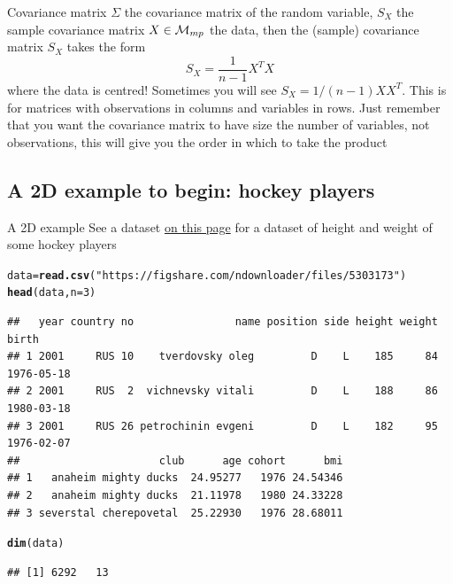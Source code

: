 \documentclass[aspectratio=169]{beamer}\usepackage[]{graphicx}\usepackage[]{xcolor}
\makeatletter
\newcommand{\hlnum}[1]{\textcolor[rgb]{0.686,0.059,0.569}{#1}}%
\newcommand{\hlsng}[1]{\textcolor[rgb]{0.192,0.494,0.8}{#1}}%
\newcommand{\hldef}[1]{\textcolor[rgb]{0.345,0.345,0.345}{#1}}%
\newcommand{\hlkwb}[1]{\textcolor[rgb]{0.69,0.353,0.396}{#1}}%
\newcommand{\hlkwc}[1]{\textcolor[rgb]{0.333,0.667,0.333}{#1}}%
\newcommand{\hlkwd}[1]{\textcolor[rgb]{0.737,0.353,0.396}{\textbf{#1}}}%
\newenvironment{kframe}{%
 \def\at@end@of@kframe{}%
 \ifinner\ifhmode%
  \def\at@end@of@kframe{\end{minipage}}%
  \begin{minipage}{\columnwidth}%
 \fi\fi%
 \def\FrameCommand##1{\hskip\@totalleftmargin \hskip-\fboxsep
 \colorbox{shadecolor}{##1}\hskip-\fboxsep
     \hskip-\linewidth \hskip-\@totalleftmargin \hskip\columnwidth}%
 \MakeFramed {\advance\hsize-\width
   \@totalleftmargin\z@ \linewidth\hsize
   \@setminipage}}%
 {\par\unskip\endMakeFramed%
 \at@end@of@kframe}
\newenvironment{knitrout}{}{} %
\makeatother
\begin{document}
\begin{frame}{Covariance matrix}
$\Sigma$ the covariance matrix of the random variable, $S_X$ the sample covariance matrix
\vfill
$X\in\mathcal{M}_{mp}$ the data, then the (sample) covariance matrix $S_X$ takes the form
\[
S_X = \frac{1}{n-1}X^TX
\]
where the data is centred!
\vfill
Sometimes you will see $S_X=1/(n-1)XX^T$. This is for matrices with observations in columns and variables in rows. Just remember that you want the covariance matrix to have size the number of variables, not observations, this will give you the order in which to take the product
\end{frame}

\subsection{A 2D example to begin: hockey players}

\begin{frame}[fragile]{A 2D example}
See a dataset \href{https://opendata.stackexchange.com/questions/7793/age-weight-and-height-dataset}{on this page} for a dataset of height and weight of some hockey players
\vfill
\begin{knitrout}
\color{fgcolor}\begin{kframe}
\begin{alltt}
\hldef{data} \hlkwb{=} \hlkwd{read.csv}\hldef{(}\hlsng{"https://figshare.com/ndownloader/files/5303173"}\hldef{)}
\hlkwd{head}\hldef{(data,} \hlkwc{n}\hldef{=}\hlnum{3}\hldef{)}
\end{alltt}
\begin{verbatim}
##   year country no                name position side height weight      birth
## 1 2001     RUS 10    tverdovsky oleg         D    L    185     84 1976-05-18
## 2 2001     RUS  2  vichnevsky vitali         D    L    188     86 1980-03-18
## 3 2001     RUS 26 petrochinin evgeni         D    L    182     95 1976-02-07
##                      club      age cohort      bmi
## 1   anaheim mighty ducks  24.95277   1976 24.54346
## 2   anaheim mighty ducks  21.11978   1980 24.33228
## 3 severstal cherepovetal  25.22930   1976 28.68011
\end{verbatim}
\begin{alltt}
\hlkwd{dim}\hldef{(data)}
\end{alltt}
\begin{verbatim}
## [1] 6292   13
\end{verbatim}
\end{kframe}
\end{knitrout}
\end{frame}
\end{document}
